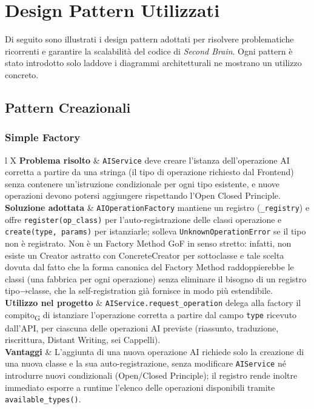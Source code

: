 \section{Design Pattern Utilizzati}
\label{sec:design-pattern}
Di seguito sono illustrati i design pattern adottati per risolvere problematiche ricorrenti e garantire la scalabilità del codice di \textit{Second Brain}. Ogni pattern è stato introdotto solo laddove i diagrammi architetturali ne mostrano un utilizzo concreto.

\newcommand{\patternTable}[4]{%
	\renewcommand{\arraystretch}{1.3}
	\begin{xltabular}{\textwidth}{l X}
		\toprule
		\textbf{Problema risolto} & #1 \\
		\midrule
		\textbf{Soluzione adottata} & #2 \\
		\midrule
		\textbf{Utilizzo nel progetto} & #3 \\
		\midrule
		\textbf{Vantaggi} & #4 \\
		\bottomrule
	\end{xltabular}
}

\subsection{Pattern Creazionali}

\subsubsection{Simple Factory}
\patternTable{
	\texttt{AIService} deve creare l'istanza dell'operazione AI corretta a partire da una stringa (il tipo di operazione richiesto dal Frontend) senza contenere un'istruzione condizionale per ogni tipo esistente, e nuove operazioni devono potersi aggiungere rispettando l'Open Closed Principle.
}{
	\texttt{AIOperationFactory} mantiene un registro (\texttt{\_registry}) e offre \texttt{register(op\_class)} per l'auto-registrazione delle classi operazione e \texttt{create(type, params)} per istanziarle; solleva \texttt{UnknownOperationError} se il tipo non è registrato. Non è un Factory Method GoF in senso stretto: infatti, non esiste un Creator astratto con ConcreteCreator per sottoclasse e tale scelta dovuta dal fatto che la forma canonica del Factory Method raddoppierebbe le classi (una fabbrica per ogni operazione) senza eliminare il bisogno di un registro tipo→classe, che la self-registration già fornisce in modo più estendibile.
}{
	\texttt{AIService.request\_operation} delega alla factory il compito\textsubscript{G} di istanziare l'operazione corretta a partire dal campo \texttt{type} ricevuto dall'API, per ciascuna delle operazioni AI previste (riassunto, traduzione, riscrittura, Distant Writing, sei Cappelli).
}{
	L'aggiunta di una nuova operazione AI richiede solo la creazione di una nuova classe e la sua auto-registrazione, senza modificare \texttt{AIService} né introdurre nuovi condizionali (Open/Closed Principle); il registro rende inoltre immediato esporre a runtime l'elenco delle operazioni disponibili tramite \texttt{available\_types()}.
}

